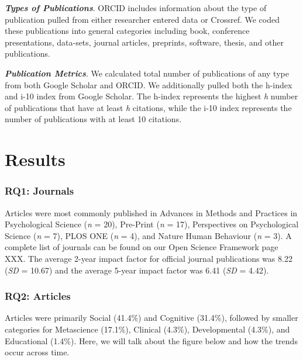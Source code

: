 \documentclass[
  english,
  man]{apa6}
\begin{document}
\textbf{\emph{Types of Publications}}. ORCID includes information about the type of publication pulled from either researcher entered data or Crossref. We coded these publications into general categories including book, conference presentations, data-sets, journal articles, preprints, software, thesis, and other publications.

\textbf{\emph{Publication Metrics}}. We calculated total number of publications of any type from both Google Scholar and ORCID. We additionally pulled both the h-index and i-10 index from Google Scholar. The h-index represents the highest \emph{h} number of publications that have at least \emph{h} citations, while the i-10 index represents the number of publications with at least 10 citations.

\hypertarget{results}{%
\section{Results}\label{results}}

\hypertarget{rq1-journals-1}{%
\subsubsection{RQ1: Journals}\label{rq1-journals-1}}

Articles were most commonly published in Advances in Methods and Practices in Psychological Science (\emph{n} = 20), Pre-Print (\emph{n} = 17), Perspectives on Psychological Science (\emph{n} = 7), PLOS ONE (\emph{n} = 4), and Nature Human Behaviour (\emph{n} = 3). A complete list of journals can be found on our Open Science Framework page XXX. The average 2-year impact factor for official journal publications was 8.22 (\emph{SD} = 10.67) and the average 5-year impact factor was 6.41 (\emph{SD} = 4.42).

\hypertarget{rq2-articles-1}{%
\subsubsection{RQ2: Articles}\label{rq2-articles-1}}

Articles were primarily Social (41.4\%) and Cognitive (31.4\%), followed by smaller categories for Metascience (17.1\%), Clinical (4.3\%), Developmental (4.3\%), and Educational (1.4\%). Here, we will talk about the figure below and how the trends occur across time.
\end{document}
